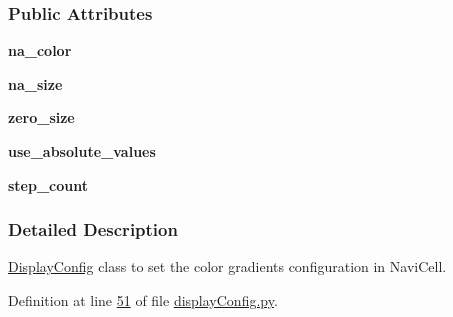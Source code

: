 \subsubsection*{Public Attributes}
\begin{DoxyCompactItemize}
\item 
\hypertarget{classnavicom_1_1displayConfig_1_1DisplayConfig_ad8f95c1e3b29ac5622a18b7328b07f50}{
{\bfseries na\_\-color}}
\label{classnavicom_1_1displayConfig_1_1DisplayConfig_ad8f95c1e3b29ac5622a18b7328b07f50}

\item 
\hypertarget{classnavicom_1_1displayConfig_1_1DisplayConfig_aa157506adb33080de983987dd182fa29}{
{\bfseries na\_\-size}}
\label{classnavicom_1_1displayConfig_1_1DisplayConfig_aa157506adb33080de983987dd182fa29}

\item 
\hypertarget{classnavicom_1_1displayConfig_1_1DisplayConfig_aab0e7c765bfc4071416c5e04fd7bbb2f}{
{\bfseries zero\_\-size}}
\label{classnavicom_1_1displayConfig_1_1DisplayConfig_aab0e7c765bfc4071416c5e04fd7bbb2f}

\item 
\hypertarget{classnavicom_1_1displayConfig_1_1DisplayConfig_a86870c1c1b5c920d4cc93554c7528d8a}{
{\bfseries use\_\-absolute\_\-values}}
\label{classnavicom_1_1displayConfig_1_1DisplayConfig_a86870c1c1b5c920d4cc93554c7528d8a}

\item 
\hypertarget{classnavicom_1_1displayConfig_1_1DisplayConfig_a79144928881551fa1f1a18d062d761ea}{
{\bfseries step\_\-count}}
\label{classnavicom_1_1displayConfig_1_1DisplayConfig_a79144928881551fa1f1a18d062d761ea}

\end{DoxyCompactItemize}


\subsubsection{Detailed Description}
\hyperlink{classnavicom_1_1displayConfig_1_1DisplayConfig}{DisplayConfig} class to set the color gradients configuration in NaviCell. 

Definition at line \hyperlink{displayConfig_8py_source_l00051}{51} of file \hyperlink{displayConfig_8py_source}{displayConfig.py}.



